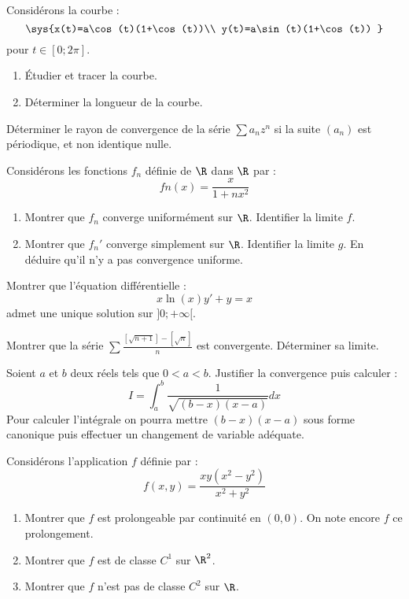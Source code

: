 \documentclass[french,11pt,twoside]{VcCours}
\begin{document}
\begin{Exercice}
  Considérons la courbe :
  \[\sys{x(t)=a\cos(t)(1+\cos(t))\\
      y(t)=a\sin(t)(1+\cos(t))
    }
  \]
  pour $t\in[0;2\pi]$.
\begin{enumerate}
  \item Étudier et tracer la courbe.
  \item Déterminer la longueur de la courbe.
\end{enumerate}
\end{Exercice}


\begin{Exercice}
  Déterminer le rayon de convergence de la série $\sum a_nz^n$ si la suite $(a_n)$ est périodique, et non identique nulle.
\end{Exercice}


\begin{Exercice}
  Considérons les fonctions $f_n$ définie de $\R$ dans $\R$ par :
  \[fn(x)=\frac{x}{1+nx^2}\]
  \begin{enumerate}
    \item Montrer que $f_n$ converge uniformément sur $\R$. Identifier la limite $f$.
    \item Montrer que $f_n'$ converge simplement sur $\R$. Identifier la limite $g$. 
    En déduire qu'il n'y a pas convergence uniforme.
\end{enumerate}
\end{Exercice}


\begin{Exercice}
  Montrer que l'équation différentielle :
  \[x\ln(x)y' + y = x\]
  admet une unique solution sur $]0;+\infty[$.
\end{Exercice}


\begin{Exercice}
  Montrer que la série $\sum\frac{[\sqrt{n+1}]-[\sqrt{n}]}{n}$
    est convergente. Déterminer sa limite.
\end{Exercice}


\begin{Exercice}
  Soient $a$ et $b$ deux réels tels que $0<a<b$. Justifier la convergence puis calculer :
  \[I=\int_a^b\frac1{\sqrt{(b-x)(x-a)}}dx\]
  Pour calculer l'intégrale on pourra mettre $(b-x)(x-a)$ sous forme canonique puis effectuer un changement de variable
  adéquate.
\end{Exercice}


\begin{Exercice}
  Considérons l'application $f$ définie par :
  \[f(x,y)=\frac{xy(x^2-y^2)}{x^2+y^2}\]
  \begin{enumerate}
    \item Montrer que $f$ est prolongeable par continuité en $(0,0)$. 
    On note encore $f$ ce prolongement.
    \item Montrer que $f$ est de classe $C^1$ sur $\R^2$.
    \item Montrer que $f$ n'est pas de classe $C^2$ sur $\R$.
\end{enumerate}
\end{Exercice}
\end{document}
